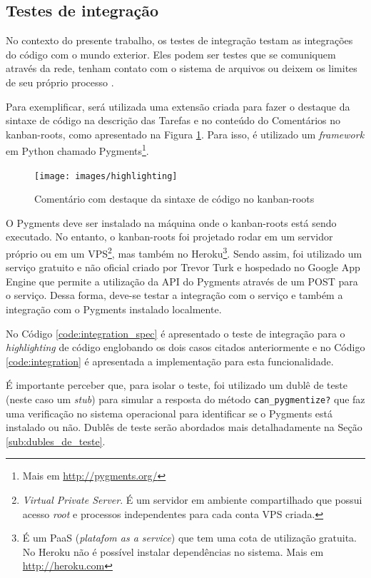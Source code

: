 \subsection{Testes de integração}
\label{sub:testes_de_integracao}

No contexto do presente trabalho, os testes de integração testam as integrações do código com o mundo exterior. Eles podem ser testes que se comuniquem através da rede, tenham contato com o sistema de arquivos ou deixem os limites de seu próprio processo \cite{ArtOfAgileDevelopment}.

Para exemplificar, será utilizada uma extensão criada para fazer o destaque da sintaxe de código na descrição das Tarefas e no conteúdo do Comentários no kanban-roots, como apresentado na Figura \ref{img:highlighting}. Para isso, é utilizado um \textit{framework} em Python chamado Pygments\footnote{ Mais em \url{http://pygments.org/}}.

\begin{figure}[h]
  \center
  \caption{Comentário com destaque da sintaxe de código no kanban-roots}
  \texttt{[image: images/highlighting]}
  \label{img:highlighting}
\end{figure}

O Pygments deve ser instalado na máquina onde o kanban-roots está sendo executado. No entanto, o kanban-roots foi projetado rodar em um servidor próprio ou em um VPS\footnote{ \textit{Virtual Private Server}. É um servidor em ambiente compartilhado que possui acesso \textit{root} e processos independentes para cada conta VPS criada.}, mas também no Heroku\footnote{ É um PaaS (\textit{platafom as a service}) que tem uma cota de utilização gratuita. No Heroku não é possível instalar dependências no sistema. Mais em \url{http://heroku.com}}. Sendo assim, foi utilizado um serviço gratuito e não oficial criado por Trevor Turk e hospedado no Google App Engine que permite a utilização da API  do Pygments através de um POST para o serviço. Dessa forma, deve-se testar a integração com o serviço e também a integração com o Pygments instalado localmente.

No Código \ref{code:integration_spec} é apresentado o teste de integração para o \textit{highlighting} de código englobando os dois casos citados anteriormente e no Código \ref{code:integration} é apresentada a implementação para esta funcionalidade.

É importante perceber que, para isolar o teste, foi utilizado um dublê de teste (neste caso um \textit{stub}) para simular a resposta do método \texttt{can\_pygmentize?} que faz uma verificação no sistema operacional para identificar se o Pygments está instalado ou não. Dublês de teste serão abordados mais detalhadamente na Seção \ref{sub:dubles_de_teste}.

